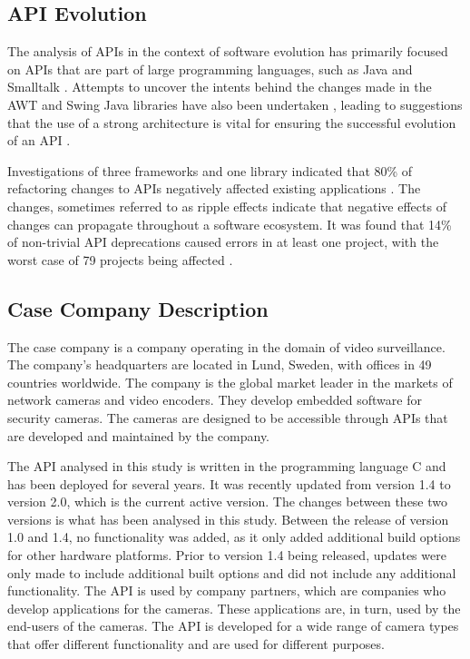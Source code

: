 \documentclass{sig-alternate}
\begin{document}
\subsection{API Evolution} \label{related_work}
The analysis of APIs in the context of software evolution has primarily focused on APIs that are part of large programming languages, such as Java \cite{hou2011exploring, shi2011empirical} and Smalltalk \cite{robbes2012developers}. Attempts to uncover the intents behind the changes made in the AWT and Swing Java libraries have also been undertaken \cite{hou2011exploring}, leading to suggestions that the use of a strong architecture is vital for ensuring the successful evolution of an API \cite{hou2011exploring}.

Investigations of three frameworks and one library indicated that 80\% of refactoring changes to APIs negatively affected existing applications \cite{dig2005role}. The changes, sometimes referred to as ripple effects \cite{robbes2012developers} indicate that negative effects of changes can propagate throughout a software ecosystem. It was found that 14\% of non-trivial API deprecations caused errors in at least one project, with the worst case of 79 projects being affected \cite{robbes2012developers}.




\subsection{Case Company Description} \label{case_company_description}
The case company is a company operating in the domain of video surveillance. The company's headquarters are located in Lund, Sweden, with offices in 49 countries worldwide. The company is the global market leader in the markets of network cameras and video encoders. They develop embedded software for security cameras. The cameras are designed to be accessible through APIs that are developed and maintained by the company. 

The API analysed in this study is written in the programming language C and has been deployed for several years. It was recently updated from version 1.4 to version 2.0, which is the current active version. The changes between these two versions is what has been analysed in this study. Between the release of version 1.0 and 1.4, no functionality was added, as it only added additional build options for other hardware platforms. Prior to version 1.4 being released, updates were only made to include additional built options and did not include any additional functionality. The API is used by company partners, which are companies who develop applications for the cameras. These applications are, in turn, used by the end-users of the cameras. The API is developed for a wide range of camera types that offer different functionality and are used for different purposes. 
\end{document}
